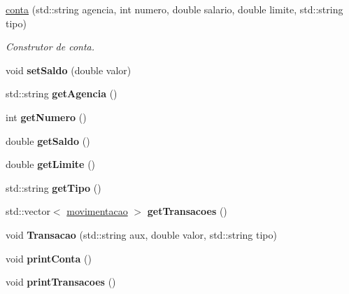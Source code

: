\begin{DoxyCompactItemize}
\item 
\mbox{\hyperlink{classconta_a56dd4dac755dbbcda1d7fdb61bb8245f}{conta}} (std\+::string agencia, int numero, double salario, double limite, std\+::string tipo)
\begin{DoxyCompactList}\small\item\em Construtor de conta. \end{DoxyCompactList}\item 
\mbox{\label{classconta_a1653e3753698d02fe0bfcfdc3301ff5c}} 
void {\bfseries set\+Saldo} (double valor)
\item 
\mbox{\label{classconta_ad4f5c632b73ee60998134998572ef84d}} 
std\+::string {\bfseries get\+Agencia} ()
\item 
\mbox{\label{classconta_a819fb9e7799572a2c0dec38c99535877}} 
int {\bfseries get\+Numero} ()
\item 
\mbox{\label{classconta_a6fe329855fbe72be943ac41252074e86}} 
double {\bfseries get\+Saldo} ()
\item 
\mbox{\label{classconta_a90eb992b9d9ea3ad16544320485b84c1}} 
double {\bfseries get\+Limite} ()
\item 
\mbox{\label{classconta_a8419db01baca870b25e8a4d0e6df606e}} 
std\+::string {\bfseries get\+Tipo} ()
\item 
\mbox{\label{classconta_a729c6bf15d4483baa63e0044c435d901}} 
std\+::vector$<$ \mbox{\hyperlink{classmovimentacao}{movimentacao}} $>$ {\bfseries get\+Transacoes} ()
\item 
\mbox{\label{classconta_a179d06e5ce3c11ecef79d24ed7446754}} 
void {\bfseries Transacao} (std\+::string aux, double valor, std\+::string tipo)
\item 
\mbox{\label{classconta_aa8a70d2a97179aa2a580ca17007e2c5d}} 
void {\bfseries print\+Conta} ()
\item 
\mbox{\label{classconta_a40fb7a725ecf0ce46bf822523e633e77}} 
void {\bfseries print\+Transacoes} ()
\end{DoxyCompactItemize}
